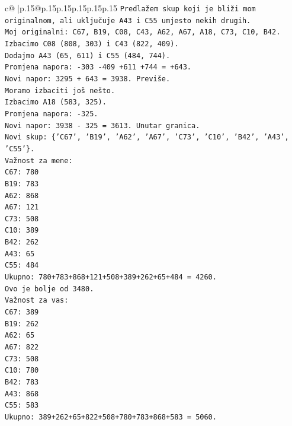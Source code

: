\documentclass{article}
\begin{document}
{\begin{supertabular}{c@{$\;$}|p{.15\linewidth}@{}p{.15\linewidth}p{.15\linewidth}p{.15\linewidth}p{.15\linewidth}p{.15\linewidth}}
{{{\texttt{Predlažem skup koji je bliži mom originalnom, ali uključuje A43 i C55 umjesto nekih drugih.} \\
\texttt{Moj originalni: C67, B19, C08, C43, A62, A67, A18, C73, C10, B42.} \\
\texttt{Izbacimo C08 (808, 303) i C43 (822, 409).} \\
\texttt{Dodajmo A43 (65, 611) i C55 (484, 744).} \\
\texttt{Promjena napora: {-}303 {-}409 +611 +744 = +643.} \\
\texttt{Novi napor: 3295 + 643 = 3938. Previše.} \\
\texttt{Moramo izbaciti još nešto.} \\
\texttt{Izbacimo A18 (583, 325).} \\
\texttt{Promjena napora: {-}325.} \\
\texttt{Novi napor: 3938 {-} 325 = 3613. Unutar granica.} \\
\texttt{Novi skup: \{'C67', 'B19', 'A62', 'A67', 'C73', 'C10', 'B42', 'A43', 'C55'\}.} \\
\texttt{Važnost za mene:} \\
\texttt{C67: 780} \\
\texttt{B19: 783} \\
\texttt{A62: 868} \\
\texttt{A67: 121} \\
\texttt{C73: 508} \\
\texttt{C10: 389} \\
\texttt{B42: 262} \\
\texttt{A43: 65} \\
\texttt{C55: 484} \\
\texttt{Ukupno: 780+783+868+121+508+389+262+65+484 = 4260.} \\
\texttt{Ovo je bolje od 3480.} \\
\texttt{Važnost za vas:} \\
\texttt{C67: 389} \\
\texttt{B19: 262} \\
\texttt{A62: 65} \\
\texttt{A67: 822} \\
\texttt{C73: 508} \\
\texttt{C10: 780} \\
\texttt{B42: 783} \\
\texttt{A43: 868} \\
\texttt{C55: 583} \\
\texttt{Ukupno: 389+262+65+822+508+780+783+868+583 = 5060.} \\
}}}
\end{supertabular}}
\end{document}
